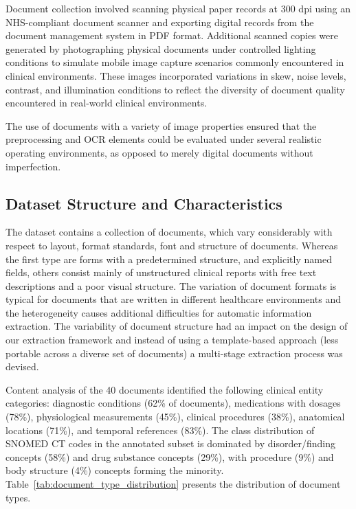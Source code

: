 Document collection involved scanning physical paper records at 300 dpi using an NHS-compliant document scanner and exporting digital records from the document management system in PDF format. Additional scanned copies were generated by photographing physical documents under controlled lighting conditions to simulate mobile image capture scenarios commonly encountered in clinical environments. These images incorporated variations in skew, noise levels, contrast, and illumination conditions to reflect the diversity of document quality encountered in real-world clinical environments.

The use of documents with a variety of image properties ensured that the preprocessing and OCR elements could be evaluated under several realistic operating environments, as opposed to merely digital documents without imperfection.

\subsection{Dataset Structure and Characteristics}

The dataset contains a collection of documents, which vary considerably with respect to layout, format standards, font and structure of documents. Whereas the first type are forms with a predetermined structure, and explicitly named fields, others consist mainly of unstructured clinical reports with free text descriptions and a poor visual structure. The variation of document formats is typical for documents that are written in different healthcare environments and the heterogeneity causes additional difficulties for automatic information extraction. The variability of document structure had an impact on the design of our extraction framework and instead of using a template-based approach (less portable across a diverse set of documents) a multi-stage extraction process was devised.

Content analysis of the 40 documents identified the following clinical entity categories: diagnostic conditions (62\% of documents), medications with dosages (78\%), physiological measurements (45\%), clinical procedures (38\%), anatomical locations (71\%), and temporal references (83\%). The class distribution of SNOMED CT codes in the annotated subset is dominated by disorder/finding concepts (58\%) and drug substance concepts (29\%), with procedure (9\%) and body structure (4\%) concepts forming the minority. Table~\ref{tab:document_type_distribution} presents the distribution of document types.


